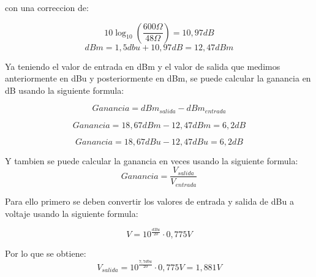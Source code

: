 con una correccion de:

\begin{equation*}
    10\log_{10}\left(\frac{600\Omega}{48\Omega}\right)=10,97dB
\end{equation*}
\begin{equation*}
    dBm=1,5dbu+10,97dB=12,47dBm
\end{equation*}

\begin{table}[H]
\centering
{}
\end{table}


Ya teniendo el valor de entrada en dBm y el valor de salida que medimos anteriormente en dBu y posteriormente en dBm, se puede calcular la ganancia en dB usando la siguiente formula:

\begin{equation*}
    Ganancia=dBm_{salida}-dBm_{entrada}
\end{equation*}

\begin{equation*}
    Ganancia=18,67dBm-12,47dBm=6,2dB    
\end{equation*}

\begin{equation*}
    Ganancia=18,67dBu-12,47dBu=6,2dB    
\end{equation*}

Y tambien se puede calcular la ganancia en veces usando la siguiente formula:
\begin{equation*}
    Ganancia=\frac{V_{salida}}{V_{entrada}}
\end{equation*}

Para ello primero se deben convertir los valores de entrada y salida de dBu a voltaje usando la siguiente formula:

\begin{equation*}
    V=10^{\frac{dBu}{20}} \cdot 0,775V
\end{equation*}

Por lo que se obtiene:
\begin{equation*}
    V_{salida}=10^{\frac{7,7dbu}{20}} \cdot 0,775V=1,881V
\end{equation*}

